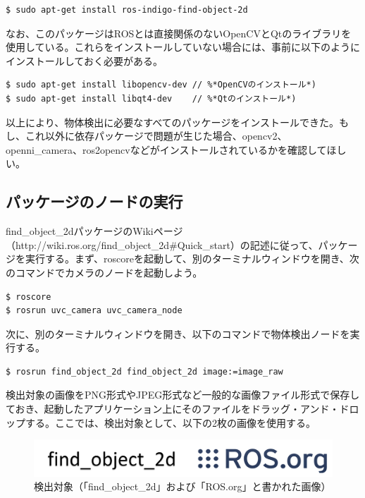 \begin{lstlisting}[language=ROS]
$ sudo apt-get install ros-indigo-find-object-2d
\end{lstlisting}

なお、このパッケージはROSとは直接関係のないOpenCVとQtのライブラリを使用している。これらをインストールしていない場合には、事前に以下のようにインストールしておく必要がある。

\begin{lstlisting}[language=ROS]
$ sudo apt-get install libopencv-dev // %*OpenCVのインストール*)
$ sudo apt-get install libqt4-dev    // %*Qtのインストール*)
\end{lstlisting}

以上により、物体検出に必要なすべてのパッケージをインストールできた。もし、これ以外に依存パッケージで問題が生じた場合、opencv2、openni\_camera、ros2opencvなどがインストールされているかを確認してほしい。

\subsection{パッケージのノードの実行}

find\_object\_2dパッケージのWikiページ（http://wiki.ros.org/find\_object\_2d#Quick\_start）の記述に従って、パッケージを実行する。まず、roscoreを起動して、別のターミナルウィンドウを開き、次のコマンドでカメラのノードを起動しよう。

\begin{lstlisting}[language=ROS]
$ roscore
$ rosrun uvc_camera uvc_camera_node
\end{lstlisting}

次に、別のターミナルウィンドウを開き、以下のコマンドで物体検出ノードを実行する。

\begin{lstlisting}[language=ROS]
$ rosrun find_object_2d find_object_2d image:=image_raw
\end{lstlisting}

検出対象の画像をPNG形式やJPEG形式など一般的な画像ファイル形式で保存しておき、起動したアプリケーション上にそのファイルをドラッグ・アンド・ドロップする。ここでは、検出対象として、以下の2枚の画像を使用する。

\begin{figure}[htp]
  \centering
  \includegraphics[width=\columnwidth]{pictures/chapter7/pic_07_09.png}
  \caption{検出対象（「find\_object\_2d」および「ROS.org」と書かれた画像）}
\end{figure}

